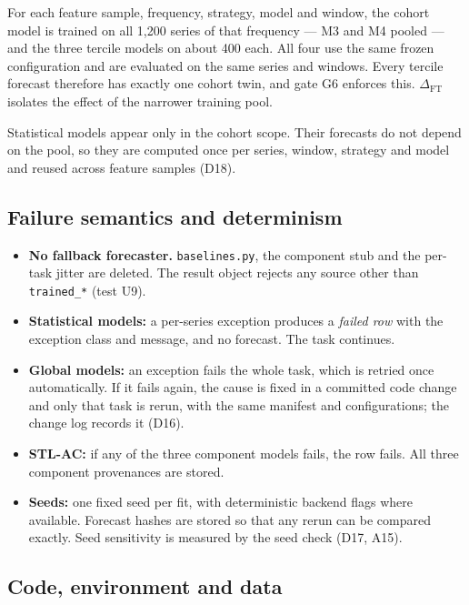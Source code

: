 \documentclass[11pt,a4paper]{article}
\newcommand{\code}[1]{\texttt{#1}}
\newcommand{\dft}{\Delta_{\mathrm{FT}}}
\begin{document}
For each feature sample, frequency, strategy, model and window, the cohort model is trained on all
1,200 series of that frequency --- M3 and M4 pooled --- and the three tercile models on about 400
each. All four use the same frozen configuration and are evaluated on the same series and windows.
Every tercile forecast therefore has exactly one cohort twin, and gate G6 enforces this. $\dft$
isolates the effect of the narrower training pool.

Statistical models appear only in the cohort scope. Their forecasts do not depend on the pool, so
they are computed once per series, window, strategy and model and reused across feature samples
(D18).

\subsection{Failure semantics and determinism}

\begin{itemize}
  \item \textbf{No fallback forecaster.} \code{baselines.py}, the component stub and the
  per-task jitter are deleted. The result object rejects any source other than \code{trained_*}
  (test U9).
  \item \textbf{Statistical models:} a per-series exception produces a \emph{failed row} with the
  exception class and message, and no forecast. The task continues.
  \item \textbf{Global models:} an exception fails the whole task, which is retried once
  automatically. If it fails again, the cause is fixed in a committed code change and only that
  task is rerun, with the same manifest and configurations; the change log records it (D16).
  \item \textbf{STL-AC:} if any of the three component models fails, the row fails. All three
  component provenances are stored.
  \item \textbf{Seeds:} one fixed seed per fit, with deterministic backend flags where available.
  Forecast hashes are stored so that any rerun can be compared exactly. Seed sensitivity is
  measured by the seed check (D17, A15).
\end{itemize}

\subsection{Code, environment and data}\label{sec:env}
\end{document}
